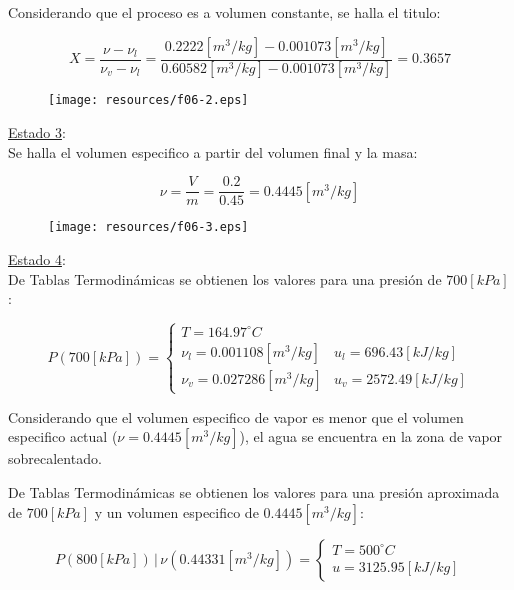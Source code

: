 \documentclass[letter,11pt]{article}
\begin{document}
\begin{enumerate}
Considerando que el proceso es a volumen constante, se halla el titulo:

\begin{equation*}
    X = \frac{\nu-\nu_l}{\nu_v-\nu_l}
      = \frac{0.2222[m^3/kg] - 0.001073[m^3/kg]}
      {0.60582[m^3/kg] - 0.001073[m^3/kg]}
      = 0.3657
\end{equation*}

\begin{figure}[H]
\centering
\texttt{[image: resources/f06-2.eps]}
\end{figure}

\underline{Estado 3}: \\
Se halla el volumen especifico a partir del volumen final y la masa:

\begin{equation*}
    \nu = \frac{V}{m} = \frac{0.2}{0.45} = 0.4445[m^3/kg]
\end{equation*}

\begin{figure}[H]
\centering
\texttt{[image: resources/f06-3.eps]}
\end{figure}

\underline{Estado 4}: \\
De Tablas Termodinámicas se obtienen los valores para una presión de $700[kPa]$:

\begin{equation*}
    P(700[kPa]) = \begin{cases}
        T = 164.97^\circ C \\
        \nu_l = 0.001108[m^3/kg] & u_l = 696.43[kJ/kg] \\
        \nu_v = 0.027286[m^3/kg] & u_v = 2572.49[kJ/kg]
    \end{cases}
\end{equation*}

Considerando que el volumen especifico de vapor es menor que el volumen
especifico actual ($\nu = 0.4445[m^3/kg]$), el agua se encuentra en la zona de
vapor sobrecalentado.

De Tablas Termodinámicas se obtienen los valores para una presión aproximada de
$700[kPa]$ y un volumen especifico de $0.4445[m^3/kg]$:

\begin{equation*}
    P(800[kPa])\,|\,\nu(0.44331[m^3/kg]) = \begin{cases}
        T = 500^\circ C \\
        u = 3125.95[kJ/kg]
    \end{cases}
\end{equation*}


\end{enumerate}
\end{document}
